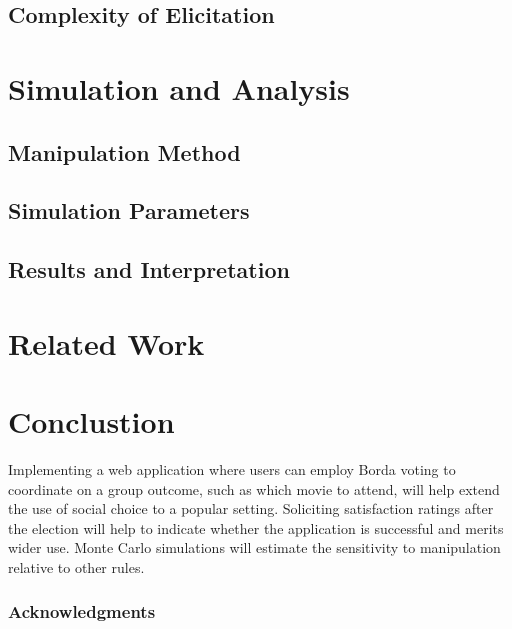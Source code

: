 \documentclass[12pt,letterpaper]{article} %
\begin{document}
\subsection{Complexity of Elicitation}


\section{Simulation and Analysis}


\subsection{Manipulation Method}

\subsection{Simulation Parameters}

\subsection{Results and Interpretation}


\section{Related Work}

\section{Conclustion}

Implementing a web application where users can employ Borda voting to coordinate on a group outcome, such as which movie to attend, will help extend the use of social choice to a popular setting. Soliciting satisfaction ratings after the election will help to indicate whether the application is successful and merits wider use. Monte Carlo simulations will estimate the sensitivity to manipulation relative to other rules. 



\subsubsection*{Acknowledgments}
\end{document}

